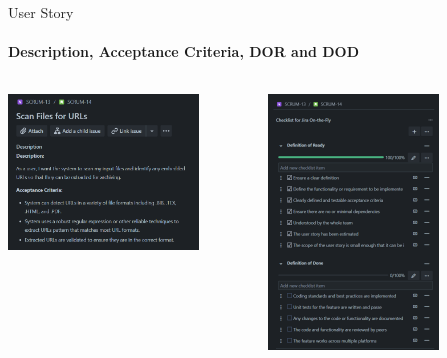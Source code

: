 \documentclass[
    ngerman,%
    authorontitle=true,
]{bfhbeamer}
\begin{document}
    \begin{frame}{User Story}
        \framesubtitle{Description, Acceptance Criteria, DOR and DOD}
        \begin{columns}
            \begin{column}{0.6\textwidth}
                \begin{center}
                    \includegraphics[width=0.8\textwidth]{pictures/user_story_1}
                \end{center}
            \end{column}
            \begin{column}{0.4\textwidth}
                \begin{center}
                    \includegraphics[width=0.7\textwidth]{pictures/user_story_2}
                \end{center}
            \end{column}
        \end{columns}
    \end{frame}
\end{document}
